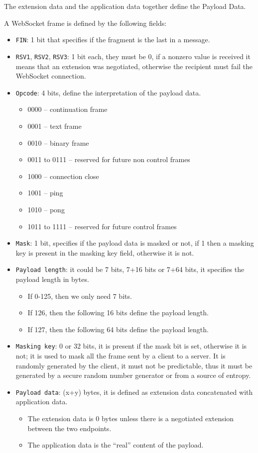 The extension data and the application data together define the Payload Data.

A WebSocket frame is defined by the following fields:
\begin{itemize}
	\item \texttt{FIN}: 1 bit that specifies if the fragment is the last in a message.
	\item \texttt{RSV1}, \texttt{RSV2}, \texttt{RSV3}: 1 bit each, they must be 0, if a nonzero value is received it means that an extension was negotiated, otherwise the recipient must fail the WebSocket connection.
	\item \texttt{Opcode}: 4 bits, define the interpretation of the payload data.
	\begin{itemize}
		\item 0000 – continuation frame
		\item 0001 – text frame
		\item 0010 – binary frame
		\item 0011 to 0111 – reserved for future non control frames
		\item 1000 – connection close
		\item 1001 – ping
		\item 1010 – pong
		\item 1011 to 1111 – reserved for future control frames
	\end{itemize}
	\item \texttt{Mask}: 1 bit, specifies if the payload data is masked or not, if 1 then a masking key is present in the masking key field, otherwise it is not.
	\item \texttt{Payload length}: it could be 7 bits, 7+16 bits or 7+64 bits, it specifies the payload length in bytes.
	\begin{itemize}
		\item If 0-125, then we only need 7 bits.
		\item If 126, then the following 16 bits define the payload length.
		\item If 127, then the following 64 bits define the payload length.
	\end{itemize}
	\item \texttt{Masking key}: 0 or 32 bits, it is present if the mask bit is set, otherwise it is not; it is used to mask all the frame sent by a client to a server.
	It is randomly generated by the client, it must not be predictable, thus it must be generated by a secure random number generator or from a source of entropy.
	\item \texttt{Payload data}: (x+y) bytes, it is defined as extension data concatenated with application data.
	\begin{itemize}
		\item The extension data is 0 bytes unless there is a negotiated extension between the two endpoints.
		\item The application data is the “real” content of the payload.
	\end{itemize}
\end{itemize}


